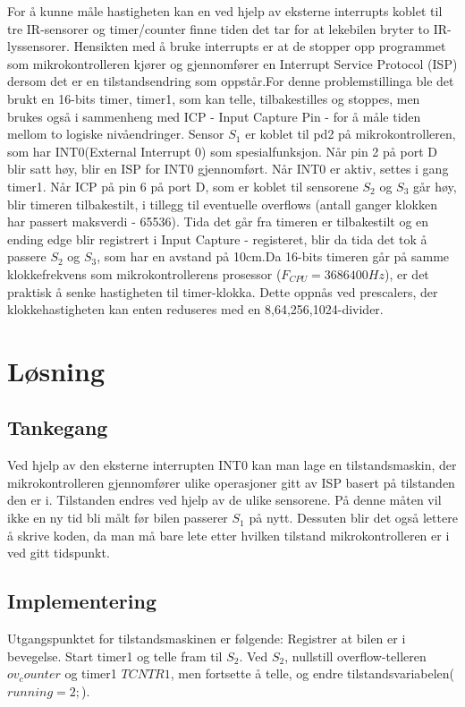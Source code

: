 \documentclass[11pt, a4paper]{article}
\begin{document}
For å kunne måle hastigheten kan en ved hjelp av eksterne interrupts koblet til tre IR-sensorer og timer/counter finne tiden det tar for at lekebilen bryter to IR-lyssensorer.
Hensikten med å bruke interrupts er at de stopper opp programmet som mikrokontrolleren kjører og gjennomfører en Interrupt Service Protocol (ISP) dersom det er en tilstandsendring som oppstår.\newline For denne problemstillinga ble det brukt en 16-bits timer, timer1, som kan telle, tilbakestilles og stoppes, men brukes også i sammenheng med ICP - Input Capture Pin - for å måle tiden mellom to logiske nivåendringer. 
Sensor $S_{1}$ er koblet til pd2 på mikrokontrolleren, som har INT0(External Interrupt 0) som spesialfunksjon. Når pin 2 på port D blir satt høy, blir en ISP for INT0 gjennomført. Når INT0 er aktiv, settes i gang timer1. Når ICP på pin 6 på port D, som er koblet til sensorene $S_{2}$ og $S_{3}$ går høy, blir timeren tilbakestilt, i tillegg til eventuelle overflows (antall ganger klokken har passert maksverdi - 65536). Tida det går fra timeren er tilbakestilt og en ending edge blir registrert i Input Capture - registeret, blir da tida det tok å passere $S_{2}$ og $S_{3}$, som har en avstand på 10cm.\newline Da 16-bits timeren går på samme klokkefrekvens som mikrokontrollerens prosessor ($F_{CPU} = 3686400 Hz$), er det praktisk å senke hastigheten til timer-klokka. Dette oppnås ved prescalers, der klokkehastigheten kan enten reduseres med en 8,64,256,1024-divider. 


\section{Løsning}
\subsection{Tankegang}
Ved hjelp av den eksterne interrupten INT0 kan man lage en tilstandsmaskin, der mikrokontrolleren gjennomfører ulike operasjoner gitt av ISP basert på tilstanden den er i. Tilstanden endres ved hjelp av de ulike sensorene. På denne måten vil ikke en ny tid bli målt før bilen passerer $S_{1}$ på nytt. Dessuten blir det også lettere å skrive koden, da man må bare lete etter hvilken tilstand mikrokontrolleren er i ved gitt tidspunkt. 

\subsection{Implementering}
Utgangspunktet for tilstandsmaskinen er følgende: Registrer at bilen er i bevegelse. Start timer1 og telle fram til $S_{2}$. Ved $S_{2}$, nullstill overflow-telleren $ov_counter$ og timer1 $TCNTR1$, men fortsette å telle, og endre tilstandsvariabelen($running = 2;$).
\end{document}
